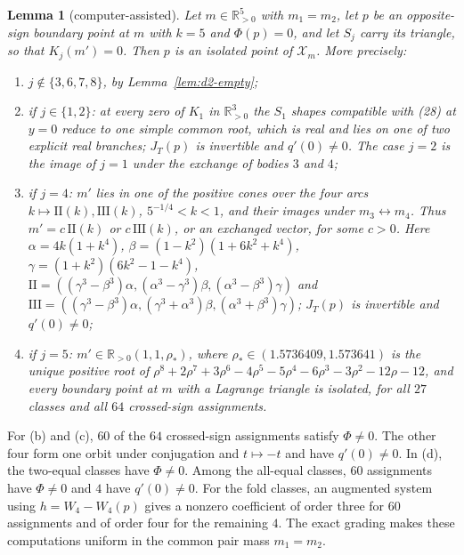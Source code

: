 \documentclass[Threeside,11pt]{article}
\newtheorem{lemma}[theorem]{Lemma}
\theoremstyle{definition}
\theoremstyle{remark}
\numberwithin{equation}{section}
\theoremstyle{remark}
\newcommand{\Rp}{\mathbb{R}_{>0}}
\newenvironment{alphalist}{\begin{enumerate}\renewcommand{\labelenumi}{(\alph{enumi})}%
  \renewcommand{\theenumi}{\alph{enumi}}}{\end{enumerate}}
\begin{document}
\begin{lemma}[computer-assisted]\label{lem:d2-K}
Let $m\in\Rp^5$ with $m_1=m_2$, let $p$ be an opposite-sign boundary point at $m$ with $k=5$ and
$\Phi(p)=0$, and let $S_j$ carry its triangle, so that $K_j(m')=0$.  Then $p$ is an isolated
point of $\mathcal X_m$.  More precisely:
\begin{alphalist}
  \item $j\notin\{3,6,7,8\}$, by Lemma~\ref{lem:d2-empty};
  \item if $j\in\{1,2\}$: at every zero of $K_1$ in $\Rp^3$ the $S_1$ shapes compatible with
  \textup{(28)} at $y=0$ reduce to one simple common root, which is real and lies on one of two
  explicit real branches; $J_T(p)$ is invertible and $q'(0)\ne0$.  The case $j=2$ is the image of
  $j=1$ under the exchange of bodies $3$ and $4$;
  \item {if $j=4$: $m'$ lies in one of the positive cones over the four arcs
  $k\mapsto\mathrm{II}(k),\mathrm{III}(k)$, $5^{-1/4}<k<1$, and their images under
  $m_3\leftrightarrow m_4$.  Thus $m'=c\,\mathrm{II}(k)$ or $c\,\mathrm{III}(k)$, or an
  exchanged vector, for some $c>0$.  Here}
  $\alpha=4k(1+k^4)$, $\beta=(1-k^2)(1+6k^2+k^4)$, $\gamma=(1+k^2)(6k^2-1-k^4)$,
  $\mathrm{II}=((\gamma^3-\beta^3)\alpha,(\alpha^3-\gamma^3)\beta,(\alpha^3-\beta^3)\gamma)$ and
  $\mathrm{III}=((\gamma^3-\beta^3)\alpha,(\gamma^3+\alpha^3)\beta,(\alpha^3+\beta^3)\gamma)$;
  $J_T(p)$ is invertible and $q'(0)\ne0$;
  \item if $j=5$: $m'\in\Rp(1,1,\rho_*)$, where $\rho_*\in(1.5736409,1.573641)$ is the unique
  positive root of $\rho^8+2\rho^7+3\rho^6-4\rho^5-5\rho^4-6\rho^3-3\rho^2-12\rho-12$, and every
  boundary point at $m$ with a Lagrange triangle is isolated, for all $27$ classes and all $64$
  crossed-sign assignments.
\end{alphalist}
\end{lemma}

{For (b) and (c), $60$ of the $64$ crossed-sign assignments satisfy
$\Phi\ne0$.  The other four form one orbit under conjugation and $t\mapsto-t$ and have
$q'(0)\ne0$.
In (d), the two-equal classes have $\Phi\ne0$.
Among the all-equal classes, $60$ assignments have $\Phi\ne0$ and $4$ have $q'(0)\ne0$.
For the fold classes, an augmented system using $h=W_4-W_4(p)$ gives a nonzero coefficient
of order three for $60$ assignments and of order four for the remaining $4$.
The exact grading makes these computations uniform in the common pair mass $m_1=m_2$.}
\end{document}
